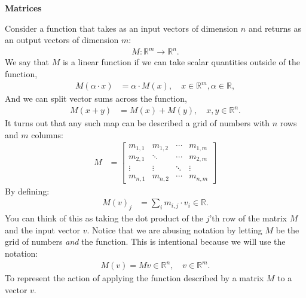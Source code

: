 \documentclass[12pt,hidelinks]{article}
\numberwithin{equation}{section}
\begin{document}
\textbf{Matrices}

Consider a function that takes as an input vectors of dimension $n$ and returns
as an output vectors of dimension $m$:
\begin{align}
M: \mathbb{R}^m \rightarrow \mathbb{R}^n.
\end{align}
We say that $M$ is a linear function if we can take scalar quantities outside
of the function,
\begin{align}
M(\alpha \cdot x) &= \alpha \cdot M(x), \quad x\in \mathbb{R}^m, \alpha \in \mathbb{R},
\end{align}
And we can split vector sums across the function,
\begin{align}
M(x + y) &= M(x) + M(y), \quad x, y\in \mathbb{R}^n.
\end{align}
It turns out that any such map can be described a grid of numbers with $n$ rows
and $m$ columns:
\begin{align}
M &= \begin{bmatrix} m_{1,1} & m_{1,2} & \cdots & m_{1,m} \\
m_{2,1} & \ddots & \cdots & m_{2,m} \\
\vdots  & \vdots & \ddots & \vdots \\
m_{n, 1} & m_{n, 2} & \cdots & m_{n, m}
\end{bmatrix}
\end{align}
By defining:
\begin{align}
M(v)_j &= \sum_i m_{i,j} \cdot v_i \in \mathbb{R}.
\end{align}
You can think of this as taking the dot product of the $j$'th row of the matrix
$M$ and the input vector $v$. Notice that we are abusing notation by letting
$M$ be the grid of numbers \textit{and} the function. This is intentional
because we will use the notation:
\begin{align}
M(v) = Mv \in \mathbb{R}^n, \quad v\in\mathbb{R}^m.
\end{align}
To represent the action of applying the function described by a matrix $M$ to
a vector $v$.
\end{document}

